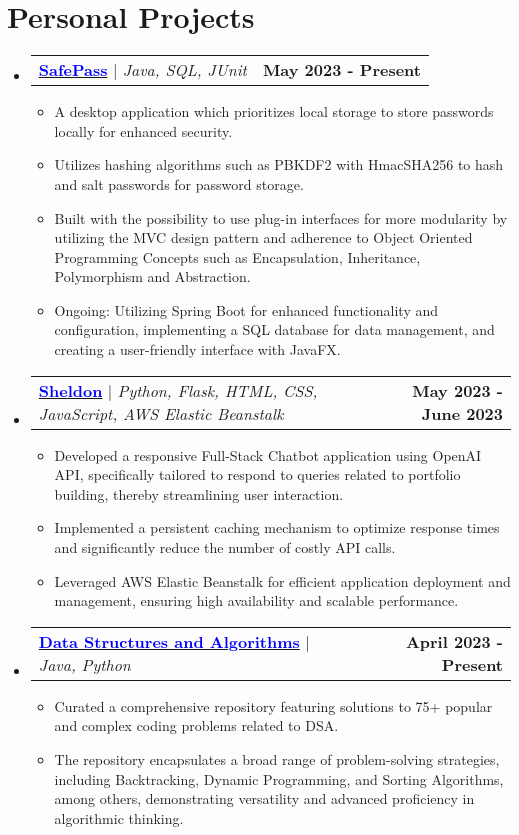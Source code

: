 \documentclass[letterpaper,11pt]{article}
\makeatletter
\newcommand{\resumeItem}[1]{
  \item\small{
    {#1 \vspace{-2pt}}
  }
}
\newcommand{\resumeProjectHeading}[2]{
    \item
    \begin{tabular*}{1.001\textwidth}{l@{\extracolsep{\fill}}r}
      \small#1 & \textbf{\small #2}\\
    \end{tabular*}\vspace{-7pt}
}
\newcommand{\resumeSubHeadingListStart}{\begin{itemize}[leftmargin=0.0in, label={}]}
\newcommand{\resumeSubHeadingListEnd}{\end{itemize}}
\newcommand{\resumeItemListStart}{\begin{itemize}}
\newcommand{\resumeItemListEnd}{\end{itemize}\vspace{-5pt}}
\makeatother
\begin{document}
\section{Personal Projects}
    \vspace{-5pt}
    \resumeSubHeadingListStart
      \resumeProjectHeading
          {\href{https://github.com/ShevinuM/SafePass}{\textcolor{blue}{\textbf{SafePass}}} $|$ \emph{Java, SQL, JUnit}}{May 2023 - Present}
          \resumeItemListStart
            \resumeItem{A desktop application which prioritizes local storage to store passwords locally for enhanced security.}
            \resumeItem{Utilizes hashing algorithms such as PBKDF2 with HmacSHA256 to hash and salt passwords for password storage.}
            \resumeItem{Built with the possibility to use plug-in interfaces for more modularity by utilizing the MVC design pattern and adherence to Object Oriented Programming Concepts such as Encapsulation, Inheritance, Polymorphism and Abstraction.}
            \resumeItem{Ongoing: Utilizing Spring Boot for enhanced functionality and configuration, implementing a SQL database for data management, and creating a user-friendly interface with JavaFX.}
          \resumeItemListEnd
          \vspace{-13pt}
      \resumeProjectHeading
          {\href{https://github.com/ShevinuM/Sheldon}{\textcolor{blue}{\textbf{Sheldon}}} $|$ \emph{Python, Flask, HTML, CSS, JavaScript, AWS Elastic Beanstalk}}{May 2023 - June 2023}
          \resumeItemListStart
            \resumeItem{Developed a responsive Full-Stack Chatbot application using OpenAI API, specifically tailored to respond to queries related to portfolio building, thereby streamlining user interaction.}
            \resumeItem{Implemented a persistent caching mechanism to optimize response times and significantly reduce the number of costly API calls.}
            \resumeItem{Leveraged AWS Elastic Beanstalk for efficient application deployment and management, ensuring high availability and scalable performance.}
          \resumeItemListEnd 
          \vspace{-13pt}
          \resumeProjectHeading
          {\href{https://github.com/ShevinuM/Data-Structures-And-Algorithms}{\textcolor{blue}{\textbf{Data Structures and Algorithms}}} $|$ \emph{Java, Python}}{April 2023 - Present}
          \resumeItemListStart
            \resumeItem{Curated a comprehensive repository featuring solutions to 75+ popular and complex coding problems related to DSA.}
            \resumeItem{The repository encapsulates a broad range of problem-solving strategies, including Backtracking, Dynamic Programming, and Sorting Algorithms, among others, demonstrating versatility and advanced proficiency in algorithmic thinking.}
          \resumeItemListEnd 
    \resumeSubHeadingListEnd
\vspace{-15pt}
\end{document}
